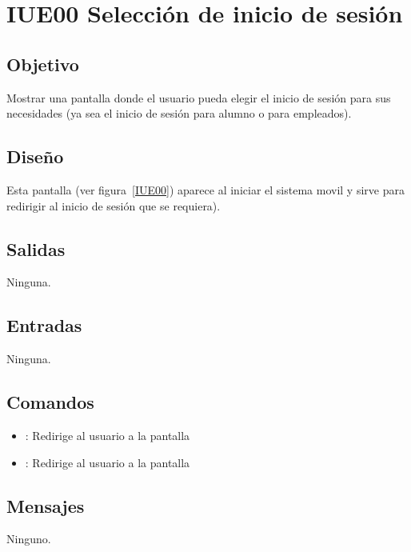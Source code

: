 \section{IUE00 Selección de inicio de sesión}

\subsection{Objetivo}
	Mostrar una pantalla donde el usuario pueda elegir el inicio de sesión para sus necesidades (ya sea el inicio de sesión para alumno o para empleados).

\subsection{Diseño}
	Esta pantalla  (ver figura~\ref{IUE00}) aparece al iniciar el sistema movil y sirve para redirigir al inicio de sesión que se requiera). 


\subsection{Salidas}

	Ninguna.

\subsection{Entradas}
	Ninguna.

\subsection{Comandos}
\begin{itemize}
	\item {}: Redirige al usuario a la pantalla 
	
	\item {}: Redirige al usuario a la pantalla 

	
\end{itemize}

\subsection{Mensajes}

\begin{Citemize}
	\item Ninguno.
\end{Citemize}

